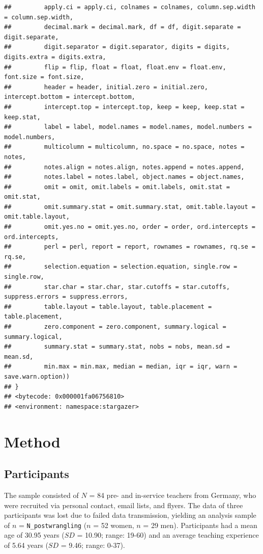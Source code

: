 \documentclass[]{elsarticle} %
\begin{document}
\begin{verbatim}
##         apply.ci = apply.ci, colnames = colnames, column.sep.width = column.sep.width, 
##         decimal.mark = decimal.mark, df = df, digit.separate = digit.separate, 
##         digit.separator = digit.separator, digits = digits, digits.extra = digits.extra, 
##         flip = flip, float = float, float.env = float.env, font.size = font.size, 
##         header = header, initial.zero = initial.zero, intercept.bottom = intercept.bottom, 
##         intercept.top = intercept.top, keep = keep, keep.stat = keep.stat, 
##         label = label, model.names = model.names, model.numbers = model.numbers, 
##         multicolumn = multicolumn, no.space = no.space, notes = notes, 
##         notes.align = notes.align, notes.append = notes.append, 
##         notes.label = notes.label, object.names = object.names, 
##         omit = omit, omit.labels = omit.labels, omit.stat = omit.stat, 
##         omit.summary.stat = omit.summary.stat, omit.table.layout = omit.table.layout, 
##         omit.yes.no = omit.yes.no, order = order, ord.intercepts = ord.intercepts, 
##         perl = perl, report = report, rownames = rownames, rq.se = rq.se, 
##         selection.equation = selection.equation, single.row = single.row, 
##         star.char = star.char, star.cutoffs = star.cutoffs, suppress.errors = suppress.errors, 
##         table.layout = table.layout, table.placement = table.placement, 
##         zero.component = zero.component, summary.logical = summary.logical, 
##         summary.stat = summary.stat, nobs = nobs, mean.sd = mean.sd, 
##         min.max = min.max, median = median, iqr = iqr, warn = save.warn.option))
## }
## <bytecode: 0x000001fa06756810>
## <environment: namespace:stargazer>
\end{verbatim}

\hypertarget{method}{%
\section{Method}\label{method}}

\hypertarget{participants}{%
\subsection{Participants}\label{participants}}

The sample consisted of \(N\) = 84 pre- and in-service teachers from
Germany, who were recruited via personal contact, email lists, and
flyers. The data of three participants was lost due to failed data
transmission, yielding an analysis sample of \(n\) =
\texttt{N\_postwrangling} (\(n\) = 52 women, \(n\) = 29 men).
Participants had a mean age of 30.95 years (\(SD\) = 10.90; range:
19-60) and an average teaching experience of 5.64 years (\(SD\) = 9.46;
range: 0-37).
\end{document}
